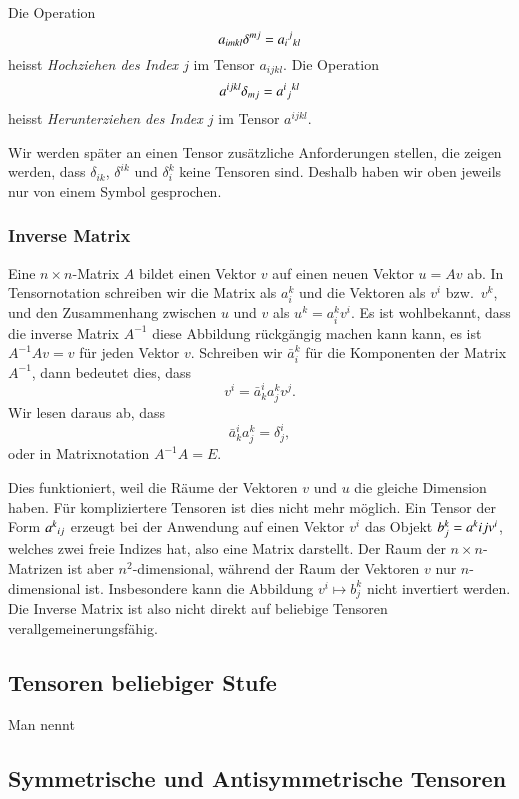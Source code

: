 \begin{definition}
Die Operation
\[
a_{imkl}\delta^{mj}=a_i\mathstrut^j\mathstrut_{kl}
\]
heisst {\em Hochziehen des Index $j$} im Tensor $a_{ijkl}$.
Die Operation
\[
a^{ijkl}\delta_{mj}=a^i\mathstrut_j\mathstrut^{kl}
\]
heisst {\em Herunterziehen des Index $j$} im Tensor $a^{ijkl}$.
\end{definition}

Wir werden später an einen Tensor zusätzliche Anforderungen stellen,
die zeigen werden, dass $\delta_{ik}$, $\delta^{ik}$ und $\delta_i^k$
keine Tensoren sind.
Deshalb haben wir oben jeweils nur von einem Symbol gesprochen.

\subsubsection{Inverse Matrix}
Eine $n\times n$-Matrix $A$ bildet einen Vektor $v$ auf einen
neuen Vektor $u=Av$ ab.
In Tensornotation schreiben wir die Matrix als $a_i^k$ und die Vektoren
als $v^i$ bzw.~$v^k$, und den Zusammenhang zwischen $u$ und $v$ als
$u^k=a_i^kv^i$.
Es ist wohlbekannt, dass die inverse Matrix $A^{-1}$ diese Abbildung
rückgängig machen kann kann, es ist $A^{-1}Av=v$ für jeden Vektor $v$.
Schreiben wir  $\bar a_i^k$ für die Komponenten der Matrix $A^{-1}$,
dann bedeutet dies, dass
\[
v^i = \bar a^i_ka_j^kv^j.
\]
Wir lesen daraus ab, dass
\[
\bar a_k^i a_j^k = \delta^i_j,
\]
oder in Matrixnotation $A^{-1}A=E$.

Dies funktioniert, weil die Räume der Vektoren $v$ und $u$ die gleiche
Dimension haben.
Für kompliziertere Tensoren ist dies nicht mehr möglich.
Ein Tensor der Form $a^k\mathstrut_{ij}$ erzeugt bei der Anwendung
auf einen Vektor $v^i$ das Objekt $b^k_j=a^k\mathstrut{ij}v^i$, welches
zwei freie Indizes hat, also eine Matrix darstellt.
Der Raum der $n\times n$-Matrizen ist aber $n^2$-dimensional, während
der Raum der Vektoren $v$ nur $n$-dimensional ist.
Insbesondere kann die Abbildung $v^i\mapsto b^k_j$ nicht invertiert
werden.
Die Inverse Matrix ist also nicht direkt auf beliebige Tensoren 
verallgemeinerungsfähig.

\subsection{Tensoren beliebiger Stufe}
Man nennt 

\subsection{Symmetrische und Antisymmetrische Tensoren}


